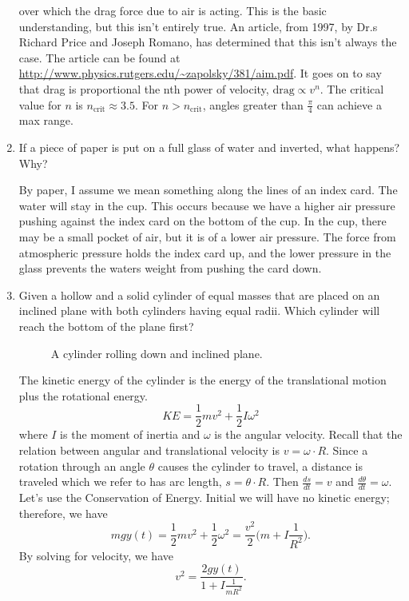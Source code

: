 \begin{enumerate}
  over which the drag force due to air is acting.
  This is the basic understanding, but this isn't entirely true.
  An article, from 1997, by Dr.s Richard Price and Joseph Romano, has determined
  that this isn't always the case.
  The article can be found at
  \url{http://www.physics.rutgers.edu/~zapolsky/381/aim.pdf}.
  It goes on to say that drag is proportional the nth power of velocity,
  \(\text{drag}\propto v^n\).
  The critical value for \(n\) is \(n_{\text{crit}}\approx 3.5\).
  For \(n > n_{\text{crit}}\), angles greater than \(\frac{\pi}{4}\) can
  achieve a max range.
\item
  If a piece of paper is put on a full glass of water and inverted, what
  happens?
  Why?
  \par\smallskip
  By paper, I assume we mean something along the lines of an index card.
  The water will stay in the cup.
  This occurs because we have a higher air pressure pushing against the index
  card on the bottom of the cup.
  In the cup, there may be a small pocket of air, but it is of a lower air
  pressure.
  The force from atmospheric pressure holds the index card up, and the lower
  pressure in the glass prevents the waters weight from pushing the card down.
\item
  Given a hollow and a solid cylinder of equal masses that are placed on an
  inclined plane with both cylinders having equal radii.
  Which cylinder will reach the bottom of the plane first?
  \begin{figure}[H]
    \centering
    
    \caption{A cylinder rolling down and inclined plane.}
  \end{figure}
  The kinetic energy of the cylinder is the energy of the translational motion
  plus the rotational energy.
  \[
  KE = \frac{1}{2}mv^2 + \frac{1}{2}I\omega^2
  \]
  where \(I\) is the moment of inertia and \(\omega\) is the angular velocity.
  Recall that the relation between angular and translational velocity is
  \(v = \omega\cdot R\).
  Since a rotation through an angle \(\theta\) causes the cylinder to travel,
  a distance is traveled which we refer to has arc length,
  \(s = \theta\cdot R\).
  Then \(\frac{ds}{dt} = v\) and \(\frac{d\theta}{dt} = \omega\).
  Let's use the Conservation of Energy.
  Initial we will have no kinetic energy; therefore, we have
  \[
  mgy(t) = \frac{1}{2}mv^2 + \frac{1}{2}\omega^2 =
  \frac{v^2}{2}\Big(m + I\frac{1}{R^2}\Big).
  \]
  By solving for velocity, we have
  \[
  v^2 = \frac{2gy(t)}{1 + I\frac{1}{mR^2}}.
\]
\end{enumerate}
